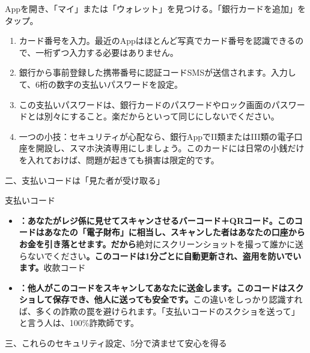 


Appを開き、「マイ」または「ウォレット」を見つける。「銀行カードを追加」をタップ。

\begin{enumerate}
  \item カード番号を入力。最近のAppはほとんど写真でカード番号を認識できるので、一桁ずつ入力する必要はありません。
  \item 銀行から事前登録した携帯番号に認証コードSMSが送信されます。入力して、6桁の数字の支払いパスワードを設定。
  \item この支払いパスワードは、銀行カードのパスワードやロック画面のパスワードとは別々にすること。楽だからといって同じにしないでください。
  \item 一つの小技：セキュリティが心配なら、銀行AppでII類またはIII類の電子口座を開設し、スマホ決済専用にしましょう。このカードには日常の小銭だけを入れておけば、問題が起きても損害は限定的です。
\end{enumerate}

二、支払いコードは「見た者が受け取る」


支払いコード

\begin{itemize}
  \item \textbf{：あなたがレジ係に見せてスキャンさせるバーコード＋QRコード。このコードはあなたの「電子財布」に相当し、スキャンした者はあなたの口座からお金を引き落とせます。だから}絶対にスクリーンショットを撮って誰かに送らないでください\textbf{。このコードは1分ごとに自動更新され、盗用を防いでいます。}收款コード
  \item \textbf{：他人がこのコードをスキャンしてあなたに送金します。このコードはスクショして保存でき、他人に送っても安全です。}この違いをしっかり認識すれば、多くの詐欺の罠を避けられます。「支払いコードのスクショを送って」と言う人は、100\%詐欺師です。
\end{itemize}

三、これらのセキュリティ設定、5分で済ませて安心を得る


